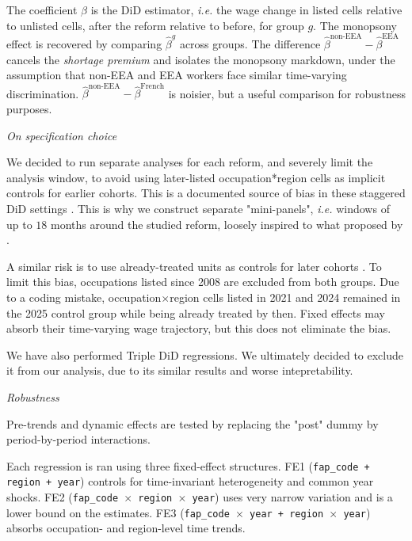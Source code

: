 \documentclass[10pt, a4paper]{article}
\begin{document}
\noindent The coefficient $\beta$ is the DiD estimator, \textit{i.e.} the wage change in listed cells relative to unlisted cells, after the reform relative to before, for group $g$. The monopsony effect is recovered by comparing $\hat\beta^g$ across groups. The difference $\hat\beta^{\text{non-EEA}} - \hat\beta^{\text{EEA}}$ cancels the \textit{shortage premium} and isolates the monopsony markdown, under the assumption that non-EEA and EEA workers face similar time-varying discrimination. $\hat\beta^{\text{non-EEA}} - \hat\beta^{\text{French}}$ is noisier, but a useful comparison for robustness purposes.
\medskip

\noindent \textit{On specification choice}

\noindent We decided to run separate analyses for each reform, and severely limit the analysis window, to avoid using later-listed occupation*region cells as implicit controls for earlier cohorts. This is a documented source of bias in these staggered DiD settings \citep{Callaway2021,Sun2021}. This is why we construct separate "mini-panels", \textit{i.e.} windows of up to $18$ months around the studied reform, loosely inspired to what proposed by \citet{Cengiz2019,Baker2022}. 

\noindent A similar risk is to use already-treated units as controls for later cohorts \citep{GoodmanBacon2021}. To limit this bias, occupations listed since 2008 are excluded from both groups. Due to a coding mistake, occupation$\times$region cells listed in 2021 and 2024 remained in the 2025 control group while being already treated by then. Fixed effects may absorb their time-varying wage trajectory, but this does not eliminate the bias.

\noindent We have also performed Triple DiD regressions. We ultimately decided to exclude it from our analysis, due to its similar results and worse intepretability. 
\medskip

\noindent \textit{Robustness}

\noindent Pre-trends and dynamic effects are tested by replacing the "post" dummy by period-by-period interactions.

\noindent Each regression is ran using three fixed-effect structures. FE1 (\texttt{fap\_code + region + year}) controls for time-invariant heterogeneity and common year shocks. FE2 (\texttt{fap\_code $\times$ region $\times$ year}) uses very narrow variation and is a lower bound on the estimates. FE3 (\texttt{fap\_code $\times$ year + region $\times$ year}) absorbs occupation- and region-level time trends.
\end{document}

